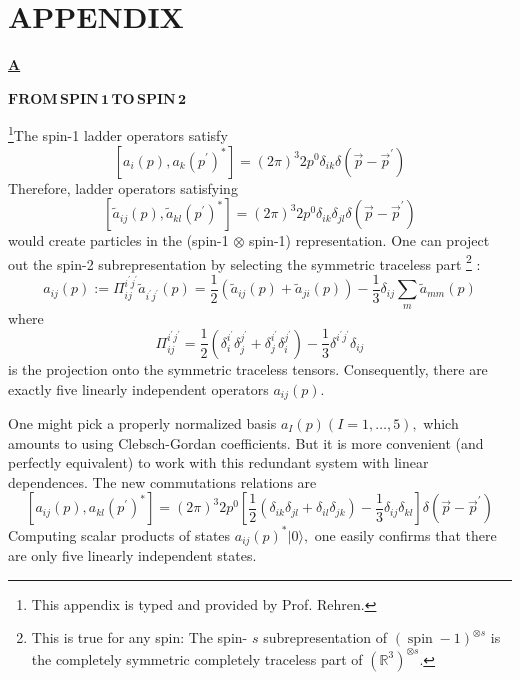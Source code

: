 \documentclass[12pt,a4paper]{article}
\numberwithin{equation}{section}
\begin{document}
\section{APPENDIX }
\begin{center}
\LARGE
\underline{\textbf{\textcolor{blue!50!black}{A}}}
\end{center}
\begin{center}

$\boldsymbol{FROM \, SPIN\, 1\, TO\, SPIN\, 2}$
\end{center}
\footnote{This appendix is typed and provided by Prof. Rehren.}The spin-1 ladder operators satisfy
$$
\left[a_{i}(p), a_{k}\left(p^{\prime}\right)^{*}\right]=(2 \pi)^{3} 2 p^{0} \delta_{i k} \delta\left(\vec{p}-\vec{p}^{\prime}\right)
$$
Therefore, ladder operators satisfying
$$
\left[\widetilde{a}_{i j}(p), \widetilde{a}_{k l}\left(p^{\prime}\right)^{*}\right]=(2 \pi)^{3} 2 p^{0} \delta_{i k} \delta_{j l} \delta\left(\vec{p}-\vec{p}^{\prime}\right)
$$
would create particles in the (spin-1 $\otimes$ spin-1) representation. One can project out the spin-2 subrepresentation by selecting the symmetric traceless part \footnote{This is true for any spin: The spin- $s$ subrepresentation of $(\operatorname{spin}-1)^{\otimes s}$ is the completely symmetric completely traceless part of $\left(\mathbb{R}^{3}\right)^{\otimes s}$.} :
$$
a_{i j}(p):=\Pi_{i j}^{i^{\prime} j^{\prime}} \widetilde{a}_{i^{\prime} j^{\prime}}(p)=\frac{1}{2}\left(\widetilde{a}_{i j}(p)+\widetilde{a}_{j i}(p)\right)-\frac{1}{3} \delta_{i j} \sum_{m} \widetilde{a}_{m m}(p)
$$
where
$$
\Pi_{i j}^{i^{\prime} j^{\prime}}=\frac{1}{2}\left(\delta_{i}^{i^{\prime}} \delta_{j}^{j^{\prime}}+\delta_{j}^{i^{\prime}} \delta_{i}^{j^{\prime}}\right)-\frac{1}{3} \delta^{i^{\prime} j^{\prime}} \delta_{i j}
$$
is the projection onto the symmetric traceless tensors. Consequently, there are exactly five linearly independent operators $a_{i j}(p)$.

One might pick a properly normalized basis $a_{I}(p)(I=1, \ldots, 5),$ which amounts to using Clebsch-Gordan coefficients. But it is more convenient (and perfectly equivalent) to work with this redundant system with linear dependences. The new commutations relations are
$$
\left[a_{i j}(p), a_{k l}\left(p^{\prime}\right)^{*}\right]=(2 \pi)^{3} 2 p^{0}\left[\frac{1}{2}\left(\delta_{i k} \delta_{j l}+\delta_{i l} \delta_{j k}\right)-\frac{1}{3} \delta_{i j} \delta_{k l}\right] \delta\left(\vec{p}-\vec{p}^{\prime}\right)
$$
Computing scalar products of states $a_{i j}(p)^{*}|0\rangle,$ one easily confirms that there are only five linearly independent states.
\end{document}
